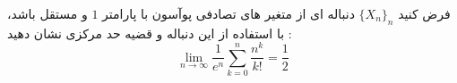 \problem{}
فرض کنید $\{X_n\}_n$ دنباله ای از متغیر های تصادفی پوآسون با پارامتر $1$ و مستقل باشد، با استفاده از این دنباله و قضیه حد مرکزی نشان دهید
:\\
\[
    \lim_{n \to \infty}\dfrac{1}{e^n}\sum_{k=0}^{n} \dfrac{n^k}{k!}=\dfrac{1}{2}
\]